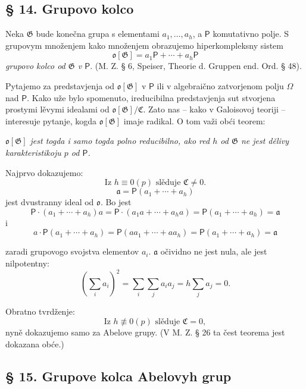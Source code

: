 \documentclass[11pt]{article}
\begin{document}
\subsection*{§ 14. Grupovo kolco}\label{der-gruppenring}

Neka \(\mathfrak G\) bude konečna grupa s elementami \(a_1,\ldots,a_h\), a \(\mathsf P\) komutativno polje. S grupovym množenjem kako množenjem obrazujemo hiperkompleksny sistem
\[
\mathfrak o[\mathfrak G]=a_1\mathsf P+\cdots+a_h\mathsf P
\]
\emph{grupovo kolco od \(\mathfrak G\) v \(\mathsf P\)}. (M. Z. § 6, Speiser, Theorie d. Gruppen end. Ord. § 48).

Pytajemo za predstavjenja od \(\mathfrak o[\mathfrak G]\) v \(\mathsf P\) ili v algebraično zatvorjenom polju \(\Omega\) nad \(\mathsf P\). Kako uže bylo spomenuto, ireducibilna predstavjenja sut stvorjena prostymi lěvymi idealami od \(\mathfrak o[\mathfrak G]/\mathfrak C\). Zato nas -- kako v Galoisovoj teoriji -- interesuje pytanje, kogda \(\mathfrak o[\mathfrak G]\) imaje radikal. O tom važi obći teorem:

\begin{center}
\emph{\(\mathfrak o[\mathfrak G]\) jest togda i samo togda polno reducibilno, ako red \(h\) od \(\mathfrak G\) ne jest dělivy karakteristikoju \(p\) od \(\mathsf P\).}
\end{center}

Najprvo dokazujemo:
\[
\text{Iz } h\equiv0(p) \text{ slěduje } \mathfrak C\ne 0.
\]
\[
\mathfrak a=\mathsf P(a_1+\cdots+a_h)
\]
jest dvustranny ideal od \(\mathfrak o\). Bo jest
\[
\mathsf P\cdot(a_1+\cdots+a_h)a
=\mathsf P\cdot(a_1a+\cdots+a_ha)
=\mathsf P(a_1+\cdots+a_h)=\mathfrak a
\]
i
\[
a\cdot\mathsf P(a_1+\cdots+a_h)
=\mathsf P(aa_1+\cdots+aa_h)
=\mathsf P(a_1+\cdots+a_h)=\mathfrak a
\]

zaradi grupovogo svojstva elementov \(a_i\). \(\mathfrak a\) očividno ne jest nula, ale jest nilpotentny:
\[
\left(\sum_i a_i\right)^2=\sum_i\sum_j a_i a_j
=h\sum_j a_j=0.
\]

Obratno tvrdženje:
\[
\text{Iz } h\not\equiv0(p) \text{ slěduje } \mathfrak C=0,
\]
nyně dokazujemo samo za Abelove grupy. (V M. Z. § 26 ta čest teorema jest dokazana obće.)

\subsection*{§ 15. Grupove kolca Abelovyh grup}\label{die-gruppenringe-abelscher-gruppen}
\end{document}
